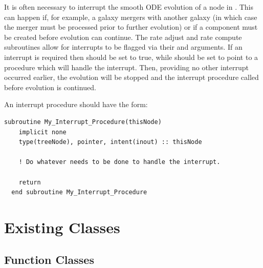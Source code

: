 It is often necessary to interrupt the smooth ODE evolution of a node in \glc. This can happen if, for example, a galaxy mergers with another galaxy (in which case the merger must be processed prior to further evolution) or if a component must be created before evolution can continue. The rate adjust and rate compute subroutines allow for interrupts to be flagged via their  and  arguments. If an interrupt is required then  should be set to true, while  should be set to point to a procedure which will handle the interrupt. Then, providing no other interrupt occurred earlier, the evolution will be stopped and the interrupt procedure called before evolution is continued.

An interrupt procedure should have the form:
\begin{lstlisting}[escapechar=@,breaklines,prebreak=\&,postbreak=\&]
  subroutine My_Interrupt_Procedure(thisNode)
    implicit none
    type(treeNode), pointer, intent(inout) :: thisNode
  
    ! Do whatever needs to be done to handle the interrupt.

    return
  end subroutine My_Interrupt_Procedure
\end{lstlisting}

\section{Existing Classes}

\subsection{Function Classes}

